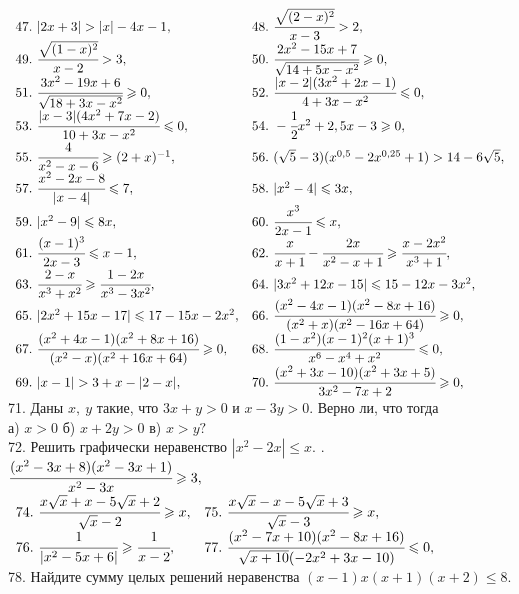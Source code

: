 $\begin{array}{ll}
47.\ |2x+3|>|x|-4x-1,&
48.\ \cfrac{\sqrt{(2-x)^2}}{x-3}>2,\\
49.\ \cfrac{\sqrt{(1-x)^2}}{x-2}>3,&
50.\ \cfrac{2x^2-15x+7}{\sqrt{14+5x-x^2}}\geqslant0,\\
51.\ \cfrac{3x^2-19x+6}{\sqrt{18+3x-x^2}}\geqslant0,&
52.\ \cfrac{|x-2|(3x^2+2x-1)}{4+3x-x^2}\leqslant0,\\
53.\ \cfrac{|x-3|(4x^2+7x-2)}{10+3x-x^2}\leqslant0,&
54.\ -\cfrac{1}{2}x^2+2,5x-3\geqslant0,\\
55.\ \cfrac{4}{x^2-x-6}\geqslant(2+x)^{-1},&
56.\ (\sqrt{5}-3)(x^{0,5}-2x^{0,25}+1)>14-6\sqrt{5},\\
57.\ \cfrac{x^2-2x-8}{|x-4|}\leqslant 7,&
58.\ |x^2-4|\leqslant3x,\\
59.\ |x^2-9|\leqslant8x,&
60.\ \cfrac{x^3}{2x-1}\leqslant x,\\
61.\ \cfrac{(x-1)^3}{2x-3}\leqslant x-1,&
62.\ \cfrac{x}{x+1}-\cfrac{2x}{x^2-x+1}\geqslant\cfrac{x-2x^2}{x^3+1},\\
63.\ \cfrac{2-x}{x^3+x^2}\geqslant\cfrac{1-2x}{x^3-3x^2},&
64.\ |3x^2+12x-15|\leqslant15-12x-3x^2,\\
65.\ |2x^2+15x-17|\leqslant17-15x-2x^2,&
66.\ \cfrac{(x^2-4x-1)(x^2-8x+16)}{(x^2+x)(x^2-16x+64)}\geqslant0,\\
67.\ \cfrac{(x^2+4x-1)(x^2+8x+16)}{(x^2-x)(x^2+16x+64)}\geqslant0,&
68.\ \cfrac{(1-x^2)(x-1)^2(x+1)^3}{x^6-x^4+x^2}\leqslant0,\\
69.\ |x-1|>3+x-|2-x|,&
70.\ \cfrac{(x^2+3x-10)(x^2+3x+5)}{3x^2-7x+2}\geqslant0,
\end{array}$\\
71. Даны $x,\ y$ такие, что $3x+y>0$ и $x-3y>0.$ Верно ли, что тогда\\
а) $x>0$ б) $x+2y>0$ в) $x>y?$\\
72. Решить графически неравенство $|x^2-2x|\leqslant x.$ . $\cfrac{(x^2-3x+8)(x^2-3x+1)}{x^2-3x}\geqslant3,$\\
$\begin{array}{ll}
74.\ \cfrac{x\sqrt{x}+x-5\sqrt{x}+2}{\sqrt{x}-2}\geqslant x,&
75.\ \cfrac{x\sqrt{x}-x-5\sqrt{x}+3}{\sqrt{x}-3}\geqslant x,\\
76.\ \cfrac{1}{|x^2-5x+6|}\geqslant \cfrac{1}{x-2},&
77.\ \cfrac{(x^2-7x+10)(x^2-8x+16)}{\sqrt{x+10}(-2x^2+3x-10)}\leqslant 0,
\end{array}$\\
78. Найдите сумму целых решений неравенства $(x-1)x(x+1)(x+2)\leqslant8.$\\
